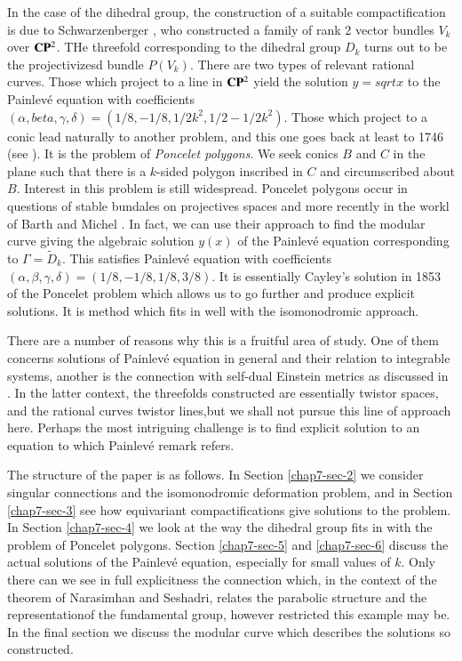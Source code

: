 In the case of the dihedral group, the construction of a suitable compactification is due to Schwarzenberger \cite{chap7-key16}, who constructed a family of rank 2 vector bundles $V_{k}$ over $\mathbf{C}\mathbf{P}^{2}$. THe threefold corresponding to the dihedral group $D_{k}$ turns out to be the projectivizesd bundle $P(V_{k})$. There are two types of relevant rational curves. Those which project to a line in $\mathbf{C}\mathbf{P}^{2}$ yield the solution $y =sqrt{x}$ to the Painlev\'e equation with coefficients $(\alpha, beta, \gamma, \delta) = (1/8, -1/8, 1/2k^{2}, 1/2-1/2k^{2})$. Those which project to a conic lead naturally to another problem, and this one goes back at least to 1746 (see \cite{chap7-key3}). It is the problem of \textit{Poncelet polygons}. We seek conics $B$ and $C$ in the plane such that there is a $k$-sided polygon inscribed in  $C$ and circumscribed about $B$. Interest in this problem is still widespread. Poncelet polygons occur in questions of stable bundales on projectives spaces\cite{chap7-key14} and more recently in the workl of Barth and Michel \cite{chap7-key1}. In fact, we can use their approach to find the modular curve giving the algebraic solution $y(x)$ of the Painlev\'e equation corresponding to $\Gamma = \tilde{D}_{k}$. This satisfies Painlev\'e equation with coefficients $(\alpha, \beta, \gamma, \delta) = (1/8, -1/8, 1/8, 3/8)$. It is essentially Cayley's solution in 1853 of the Poncelet problem which allows us to go further and produce explicit solutions. It is method which fits in well with the isomonodromic approach. 

There are a number of reasons why this is a fruitful area of study. One of them concerns solutions of Painlev\'e equation in general and their relation to integrable systems, another is the connection with self-dual Einstein metrics as discussed in \cite{chap7-key6}. In the latter context, the threefolds constructed are essentially twistor spaces, and the rational curves twistor lines,but we shall not pursue this line of approach here. Perhaps the most intriguing challenge is to find  explicit solution to an equation to which Painlev\'e remark refers.

The structure of the paper is as follows. In Section \ref{chap7-sec-2} we consider singular connections and the isomonodromic deformation problem, and in Section \ref{chap7-sec-3} see how equivariant compactifications give solutions to the problem. In Section \ref{chap7-sec-4} we look at the way the dihedral group fits in with the problem of Poncelet polygons. Section \ref{chap7-sec-5} and \ref{chap7-sec-6} discuss the actual solutions of the Painlev\'e equation, especially for small values of $k$. Only there can we see in full explicitness the connection which, in the context of the theorem of Narasimhan and Seshadri, relates the parabolic structure and the representation\pageoriginale of the fundamental group, however restricted this example may be. In the final section we discuss the modular curve which describes the solutions so constructed.

